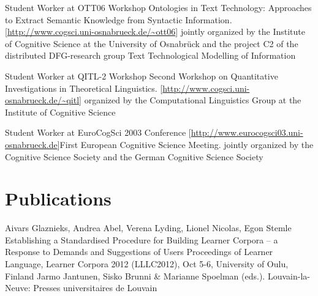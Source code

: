 \documentclass[11pt,a4paper]{moderncv}
\begin{document}
        {Student Worker at OTT06}
        {Workshop}
        {Ontologies in Text Technology: Approaches to Extract Semantic
        Knowledge from Syntactic Information.}
        {[\url{http://www.cogsci.uni-osnabrueck.de/~ott06}]}
        {jointly organized by the Institute of Cognitive Science at the
        University of Osnabr\"{u}ck and the project C2 of the distributed
        DFG-research group Text Technological Modelling of Information}

        {Student Worker at QITL-2}
        {Workshop}
        {Second Workshop on Quantitative Investigations in Theoretical
        Linguistics.}
        {[\url{http://www.cogsci.uni-osnabrueck.de/~qitl}]}
        {organized by the Computational Linguistics Group at the Institute of
        Cognitive Science}

        {Student Worker at EuroCogSci 2003}
        {Conference}
        {[\url{http://www.eurocogsci03.uni-osnabrueck.de}]}{First European
        Cognitive Science Meeting.}
        {jointly organized by the Cognitive Science Society and the German
        Cognitive Science Society}
\closesection{}


%
%

\section{Publications}
    


        {Aivars Glaznieks, Andrea Abel, Verena Lyding, Lionel Nicolas, Egon
        Stemle}
        {\small Establishing a Standardised Procedure for Building Learner
        Corpora – a Response to Demands and Suggestions of Users}
        {\small Proceedings of Learner Language, Learner Corpora 2012
        (LLLC2012), Oct 5-6, University of Oulu, Finland}
        {\small Jarmo Jantunen, Sisko Brunni \&
        Marianne Spoelman (eds.). Louvain-la-Neuve: Presses universitaires de
        Louvain}
        {}
\end{document}
